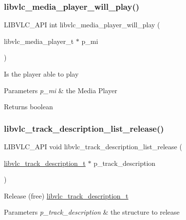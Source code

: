 \subsubsection{\texorpdfstring{libvlc\+\_\+media\+\_\+player\+\_\+will\+\_\+play()}{libvlc\_media\_player\_will\_play()}}
{\footnotesize\ttfamily L\+I\+B\+V\+L\+C\+\_\+\+A\+PI int libvlc\+\_\+media\+\_\+player\+\_\+will\+\_\+play (\begin{DoxyParamCaption}\item[{libvlc\+\_\+media\+\_\+player\+\_\+t $\ast$}]{p\+\_\+mi }\end{DoxyParamCaption})}

Is the player able to play


\begin{DoxyParams}{Parameters}
{\em p\+\_\+mi} & the Media Player \\
\hline
\end{DoxyParams}
\begin{DoxyReturn}{Returns}
boolean
\end{DoxyReturn}
\mbox{\label{group__libvlc__media__player_gaffdae51d73f23127456631b87457beb2}} 
\subsubsection{\texorpdfstring{libvlc\+\_\+track\+\_\+description\+\_\+list\+\_\+release()}{libvlc\_track\_description\_list\_release()}}
{\footnotesize\ttfamily L\+I\+B\+V\+L\+C\+\_\+\+A\+PI void libvlc\+\_\+track\+\_\+description\+\_\+list\+\_\+release (\begin{DoxyParamCaption}\item[{\hyperlink{structlibvlc__track__description__t}{libvlc\+\_\+track\+\_\+description\+\_\+t} $\ast$}]{p\+\_\+track\+\_\+description }\end{DoxyParamCaption})}

Release (free) \hyperlink{structlibvlc__track__description__t}{libvlc\+\_\+track\+\_\+description\+\_\+t}


\begin{DoxyParams}{Parameters}
{\em p\+\_\+track\+\_\+description} & the structure to release \\
\hline
\end{DoxyParams}
\mbox{\label{group__libvlc__media__player_ga952b5c8fffa72a993f0ea61bf5b5711c}} 
